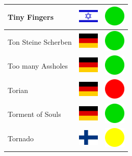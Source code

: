 \documentclass[12pt, a4paper, twoside]{report}
\begin{document}
\begin{center}
\begin{longtable}{|p{5cm}|p{2cm}|p{2cm}|}
 Tiny Fingers                                               & \includegraphics[width=1cm]{../4x3/il} &   \includegraphics[width=1cm]{../likes/y} \\ \hline
 Ton Steine Scherben                                        & \includegraphics[width=1cm]{../4x3/de} &   \includegraphics[width=1cm]{../likes/y} \\ \hline
 Too many Assholes                                          & \includegraphics[width=1cm]{../4x3/de} &   \includegraphics[width=1cm]{../likes/y} \\ \hline
 Torian                                                     & \includegraphics[width=1cm]{../4x3/de} &   \includegraphics[width=1cm]{../likes/n} \\ \hline
 Torment of Souls                                           & \includegraphics[width=1cm]{../4x3/de} &   \includegraphics[width=1cm]{../likes/y} \\ \hline
 Tornado                                                    & \includegraphics[width=1cm]{../4x3/fi} &   \includegraphics[width=1cm]{../likes/m} \\ \hline

\end{longtable}
\end{center}
\end{document}
